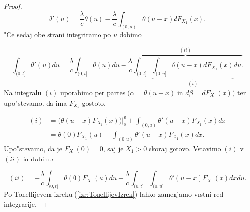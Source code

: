 \documentclass[12pt, a4paper, reqno]{amsart}
\theoremstyle{definition}
\theoremstyle{plain}
\newcommand{\1}{\mathds{1}}
\begin{document}
\begin{proof}
                \begin{equation*}
                    \theta'(u) = \frac{\lambda}{c}\theta(u) - \frac{\lambda}{c}\int_{(0, u)}\theta(u - x)dF_{X_1}(x).
                \end{equation*}
                "Ce sedaj obe strani integriramo po $u$ dobimo
                
                \begin{equation}
                    \int_{(0, t]}\theta'(u)du = \frac{\lambda}{c}\int_{(0, t]}\theta(u)du - \overbrace{\frac{\lambda}{c}\int_{(0, t]}\underbrace{\int_{(0, u]}\theta(u - x)dF_{X_1}(x)}_{(i)}du.}^{(ii)} 
                    \label{eq:verjetnostPrezivetjaIntegral}
                \end{equation}
                Na integralu $(i)$ uporabimo per partes $\bigl(\alpha = \theta(u-x)$ in $d\beta = dF_{X_1}(x)\bigr)$ 
                ter upo"stevamo, da ima $F_{X_1}$ gostoto.

                \begin{align*}
                    (i)     &= \bigl(\theta(u - x)F_{X_1}(x)\bigr)\Big|_{0}^{u} + \int_{(0, u)}\theta'(u - x)F_{X_1}(x)dx \\
                            &= \theta(0)F_{X_1}(u) - \int_{(0, u)}\theta'(u - x)F_{X_1}(x)dx.
                \end{align*}
                Upo"stevamo, da je $F_{X_1}(0) = 0$, saj je $X_1 > 0$ skoraj gotovo. Vstavimo $(i)$ 
                v $(ii)$ in dobimo

                \begin{equation*}
                    (ii) =  - \frac{\lambda}{c}\int_{(0, t]}\theta(0)F_{X_1}(u)du - \frac{\lambda}{c}\int_{(0, t]}\int_{(0, u]}\theta'(u - x)F_{X_1}(x)dxdu. 
                \end{equation*}
                Po Tonellijevem izreku (\ref{izr:TonellijevIzrek}) lahko zamenjamo vrstni red integracije.


\end{proof}
\end{document}
